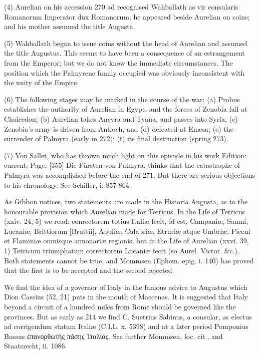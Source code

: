 (4) Aurelian on his accession 270 ad recognised Wahballath as vir consularis Romanorum Imperator dux Romanorum; he appeared beside Aurelian on coins; and his mother assumed the title Augusta.

(5) Wahballath began to issue coins without the head of Aurelian and assumed the title Augustus. This seems to have been a consequence of an estrangement from the Emperor; but we do not know the immediate circumstances. The position which the Palmyrene family occupied was obviously inconsistent with the unity of the Empire.

(6) The following stages may be marked in the course of the war: (a) Probus establishes the authority of Aurelian in Egypt, and the forces of Zenobia fail at Chalcedon; (b) Aurelian takes Ancyra and Tyana, and passes into Syria; (c) Zenobia\texthebrew{}’s army is driven from Antioch, and (d) defeated at Emesa; (e) the surrender of Palmyra (early in 272); (f) its final destruction (spring 273).

(7) Von Sallet, who has thrown much light on this episode in his work Edition: current; Page: [355] Die Fürsten von Palmyra, thinks that the catastrophe of Palmyra was accomplished before the end of 271. But there are serious objections to his chronology. See Schiller, i. 857-864.


As Gibbon notices, two statements are made in the Historia Augusta, as to the honourable provision which Aurelian made for Tetricus. In the Life of Tetricus (xxiv. 24, 5) we read: conrectorem totius Italiæ fecit, id est, Campaniæ, Samni, Lucaniæ, Brittiorum [Bruttii], Apuliæ, Calabriæ, Etruriæ atque Umbriæ, Piceni et Flaminiæ omnisque annonariæ regionis; but in the Life of Aurelian (xxvi. 39, 1) Tetricum triumphatum correctorem Lucaniæ fecit (so Aurel. Victor. \&c.). Both statements cannot be true, and Mommsen (Ephem. epig. i. 140) has proved that the first is to be accepted and the second rejected.

We find the idea of a governor of Italy in the famous advice to Augustus which Dion Cassius (52, 21) puts in the mouth of Maecenas. It is suggested that Italy beyond a circuit of a hundred miles from Rome should be governed like the provinces. But as early as 214 we find C. Suetrius Sabinus, a consular, as electus ad corrigendum statum Italiæ (C.I.L. x. 5398) and at a later period Pomponius Bassus \textgreek{\texthebrew{ἐ}πανορθωτ\texthebrew{ὴ}ς πάσης \texthebrew{Ἰ}ταλίας}. See further Mommsen, loc. cit., and Staatsrecht, ii. 1086.

